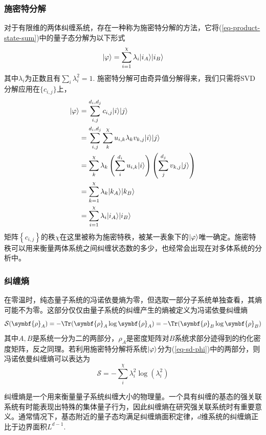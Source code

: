 \subsubsection{施密特分解}

对于有限维的两体纠缠系统，存在一种称为施密特分解的方法，它将(\ref{eq-product-state-sum})中的量子态分解为以下形式
\begin{equation}\label{eq-sd-phi}
\lvert\varphi\rangle=\sum_{i=1}^{\chi} \lambda_i \lvert i_A\rangle\lvert i_B\rangle
\end{equation}
其中$\lambda_i$为正数且有$\sum_i \lambda_i^2 = 1$. 施密特分解可由奇异值分解得来，我们只需将SVD分解应用在$\{c_{i,j}\}$上，
\begin{align}
	\lvert\varphi\rangle &= \sum_{i,j}^{d_i,d_j} c_{i,j}\lvert i\rangle\lvert j\rangle \\
		 &= \sum_{i,j}^{d_i,d_j} \sum_k^\chi u_{i,k} \lambda_{k} v_{k,j} \lvert i\rangle\lvert j\rangle\\
		 &= \sum_k^\chi \lambda_k \left( \sum_i^{d_i}u_{i,k}\lvert i\rangle \right) \left( \sum_j^{d_j}v_{k,j}\lvert j\rangle \right)\\
		 &= \sum_{k=1}^{\chi} \lambda_k \lvert k_A\rangle\lvert k_B\rangle\\
		 &= \sum_{i=1}^{\chi} \lambda_i \lvert i_A\rangle\lvert i_B\rangle
\end{align}
矩阵$\left\{c_{i,j}\right\}$的秩$\chi$在这里被称为施密特秩，被某一表象下的$\lvert\varphi\rangle$唯一确定。施密特秩可以用来衡量两体系统之间纠缠状态数的多少，也经常会出现在对多体系统的分析中。

\subsubsection{纠缠熵}

在零温时，纯态量子系统的冯诺依曼熵为零，但选取一部分子系统单独查看，其熵可能不为零。这部分仅仅由量子系统的纠缠产生的熵被定义为冯诺依曼纠缠熵\cite{eisertColloquiumAreaLaws2010}
\begin{equation}
\mathcal{S}(\symbf{\rho}_A) = -\Tr(\symbf{\rho}_A\log\symbf{\rho}_A) = -\Tr(\symbf{\rho}_B\log\symbf{\rho}_B)
\end{equation}
其中$A,B$是系统一分为二的两部分，$\rho_A$是密度矩阵对$B$系统求部分迹得到的约化密度矩阵，反之同理。若利用施密特分解将系统$\lvert\varphi\rangle$分为(\ref{eq-sd-phi})中的两部分，则冯诺依曼纠缠熵可以表达为
\begin{equation}
\mathcal{S} = -\sum_i^\chi \lambda_i^2\log\left(\lambda_i^2\right)
\end{equation}

纠缠熵是一个用来衡量量子系统纠缠大小的物理量。一个具有纠缠的基态的强关联系统有时能表现出特殊的集体量子行为\cite{vidalEntanglementQuantumCritical2003}，因此纠缠熵在研究强关联系统时有重要意义。通常情况下，基态附近的量子态均满足纠缠熵面积定律，$d$维系统的纠缠熵正比于边界面积$L^{d-1}$. 
